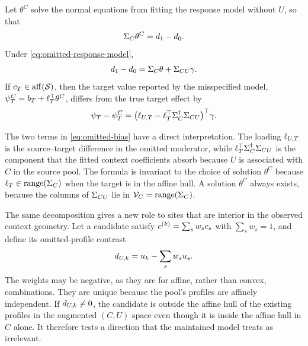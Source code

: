\begin{proposition}
\label{prop:omitted-bias}
Let $\theta^C$ solve the normal equations from fitting the response model
without $U$, so that
\begin{equation}
  \Sigma_C\theta^C=d_{1}-d_{0}.
  \label{eq:omitted-normal-equation}
\end{equation}
Under \eqref{eq:omitted-response-model},
\begin{equation}
  d_{1}-d_{0}=\Sigma_C\theta+\Sigma_{CU}\gamma.
  \label{eq:omitted-moment-shift}
\end{equation}
If $c_T\in\operatorname{aff}(\mathcal S)$, then the target value reported by the
misspecified model, $\psi_T^C=b_T+\ell_T^\top\theta^C$, differs from the
true target effect by
\begin{equation}
  \psi_T-\psi_T^C
  =\bigl(\ell_{U,T}-\ell_T^\top\Sigma_C^\dagger\Sigma_{CU}\bigr)^\top\gamma.
  \label{eq:omitted-bias}
\end{equation}
\end{proposition}

The two terms in \eqref{eq:omitted-bias} have a direct interpretation. The
loading $\ell_{U,T}$ is the source--target difference in the omitted moderator,
while $\ell_T^\top\Sigma_C^\dagger\Sigma_{CU}$ is the component that the fitted
context coefficients absorb because $U$ is associated with $C$ in the source
pool. The formula is invariant to the choice of solution $\theta^C$ because
$\ell_T\in\operatorname{range}(\Sigma_C)$ when the target is in the affine hull. A
solution $\theta^C$ always exists, because the columns of $\Sigma_{CU}$ lie in
$\mathcal V_C=\operatorname{range}(\Sigma_C)$.

The same decomposition gives a new role to sites that are interior in the
observed context geometry. Let a candidate satisfy
$c^{(k)}=\sum_s w_s c_s$ with $\sum_s w_s=1$, and define its omitted-profile
contrast
\begin{equation}
  d_{U,k}=u_k-\sum_s w_su_s.
  \label{eq:omitted-direction}
\end{equation}
The weights may be negative, as they are for affine, rather than convex,
combinations. They are unique because the pool's profiles are affinely
independent. If $d_{U,k}\neq0$, the candidate is outside the affine
hull of the existing profiles in the augmented $(C,U)$ space even though
it is inside the affine hull in $C$ alone. It therefore tests a direction that the
maintained model treats as irrelevant.

